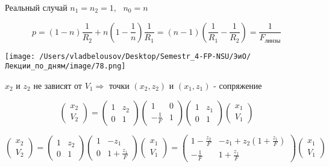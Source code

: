 \documentclass[12pt, a4paper]{report}
\begin{document}
Реальный случай \( n_1 = n_2 =1, \text{ } n_0 = n \) 

\[  p = (1 - n ) \frac{1}{R_2} + n \left( 1 - \frac{1}{n }  \right) \frac{1}{R_1} =   (n -1 ) \left(  \frac{1}{R_1 } - \frac{1}{R_2 }   \right) = \frac{1}{F_{\text{линзы} } }  \] 

\begin{center}
    \texttt{[image: /Users/vladbelousov/Desktop/Semestr\_4-FP-NSU/ЭиО/Лекции\_по\_дням/image/78.png]}
\end{center} 

\( x_2    \) и \( z_2 \) не зависят от \( V_1 \Rightarrow  \) точки \( (x_2 ,z_2 ) \) и \( (x_1 ,z_1 ) \) - сопряжение 

\[ \begin{pmatrix}
x_2 \\
V_2 
\end{pmatrix} =   
\begin{pmatrix}
    1  & z_2  \\
    0  & 1 
\end{pmatrix}
\begin{pmatrix}
    1  & 0  \\
    -\frac{1}{F}   & 1 
\end{pmatrix}
\begin{pmatrix}
    1  & z_1  \\
    0  & 1 
\end{pmatrix}
\begin{pmatrix}
    x_1 \\
    V_1
\end{pmatrix}
\] 

\[ \begin{pmatrix}
    x_2 \\
    V_2 
\end{pmatrix} =
\begin{pmatrix}
    1  & z_2  \\
    0  & 1 
\end{pmatrix}
\begin{pmatrix}
    1  & -z_1  \\
    0  & 1+\frac{z_1}{F}  
\end{pmatrix} 
\begin{pmatrix}
    x_1 \\
    V_1
\end{pmatrix}=
\begin{pmatrix}
    1- \frac{z_2}{F }   & -z_1 + z_2   \left( 1 + \frac{z_1}{F}  \right)\\
    - \frac{1}{F }  & 1+ \frac{z_1}{F}  
\end{pmatrix}
\begin{pmatrix}
    x_1 \\
    V_1
\end{pmatrix}
\] 
\end{document}
